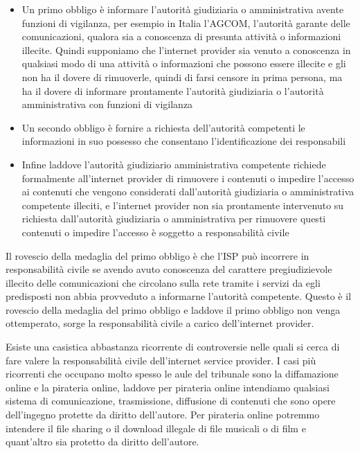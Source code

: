 \begin{itemize}
    \item Un primo obbligo è informare l'autorità giudiziaria o amministrativa avente funzioni di vigilanza, per esempio in Italia l'AGCOM, l'autorità garante delle comunicazioni, qualora sia a conoscenza di presunta attività o informazioni illecite. Quindi supponiamo che l'internet provider sia venuto a conoscenza in qualsiasi modo di una attività o informazioni che possono essere illecite e gli non ha il dovere di rimuoverle, quindi di farsi censore in prima persona, ma ha il dovere di informare prontamente l'autorità giudiziaria o l'autorità amministrativa con funzioni di vigilanza
    \item Un secondo obbligo è fornire a richiesta dell'autorità competenti le informazioni in suo possesso che consentano l'identificazione dei responsabili
    \item Infine laddove l'autorità giudiziario amministrativa competente richiede formalmente all'internet provider di rimuovere i contenuti o impedire l'accesso ai contenuti che vengono considerati dall'autorità giudiziaria o amministrativa competente illeciti, e l'internet provider non sia prontamente intervenuto su richiesta dall'autorità giudiziaria o amministrativa per rimuovere questi contenuti o impedire l'accesso è soggetto a responsabilità civile

\end{itemize}

Il rovescio della medaglia del primo obbligo è che l'ISP può incorrere in responsabilità civile se avendo avuto conoscenza del carattere pregiudizievole illecito delle comunicazioni che circolano sulla rete tramite i servizi da egli predisposti non abbia provveduto a informarne l'autorità competente. Questo è il rovescio della medaglia del primo obbligo e laddove il primo obbligo non venga ottemperato, sorge la responsabilità civile a carico dell'internet provider. 

Esiste una casistica abbastanza ricorrente di controversie nelle quali si cerca di fare valere la responsabilità civile dell'internet service provider. I casi più ricorrenti che occupano molto spesso le aule del tribunale sono la diffamazione online e la pirateria online, laddove per pirateria online intendiamo qualsiasi sistema di comunicazione, trasmissione, diffusione di contenuti che sono opere dell'ingegno protette da diritto dell'autore. Per pirateria online potremmo intendere il file sharing o il download illegale di file musicali o di film e quant'altro sia protetto da diritto dell'autore. 

